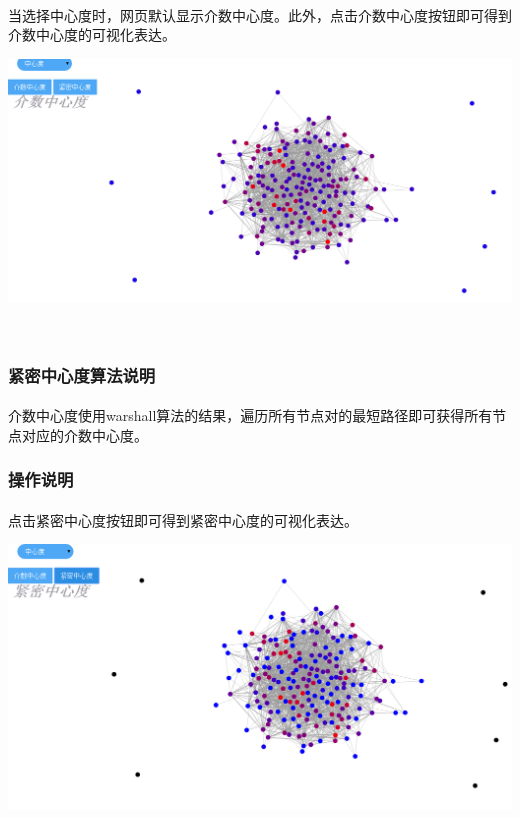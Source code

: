 \documentclass{article}
\begin{document}
\begin{CJK}{UTF8}{gkai}
			\paragraph{}
			当选择中心度时，网页默认显示介数中心度。此外，点击介数中心度按钮即可得到介数中心度的可视化表达。
		\\[\intextsep] 
		\begin{minipage}{\textwidth} 
		    \centering 
		    \includegraphics[width=0.9\linewidth]{bc.PNG}
		\end{minipage} 
		\\[\intextsep] 

		\subsubsection{紧密中心度算法说明}
			\paragraph{}
			介数中心度使用warshall算法的结果，遍历所有节点对的最短路径即可获得所有节点对应的介数中心度。
		\subsubsection{操作说明} %
			\paragraph{}
			点击紧密中心度按钮即可得到紧密中心度的可视化表达。		
		\\[\intextsep] 
		\begin{minipage}{\textwidth} 
		    \centering 
		    \includegraphics[width=0.9\linewidth]{cc.PNG}
		\end{minipage} 
		\\[\intextsep] 


\end{CJK}
\end{document}
